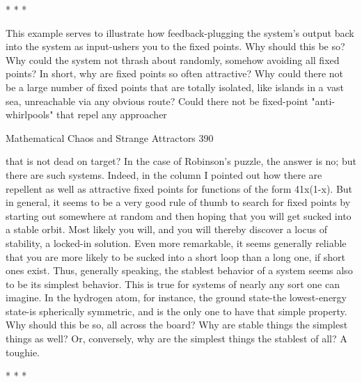                                          *   *   *

       This example serves to illustrate how feedback-plugging the system's output
back into the system as input-ushers you to the fixed points. Why should this be so?
Why could the system not thrash about randomly, somehow avoiding all fixed points?
In short, why are fixed points so often attractive? Why could there not be a large
number of fixed points that are totally isolated, like islands in a vast sea, unreachable
via any obvious route? Could there not be fixed-point "anti-whirlpools" that repel any
approacher




Mathematical Chaos and Strange Attractors                                                390

that is not dead on target? In the case of Robinson's puzzle, the answer is no; but there
are such systems. Indeed, in the column I pointed out how there are repellent as well
as attractive fixed points for functions of the form 41x(1-x). But in general, it seems
to be a very good rule of thumb to search for fixed points by starting out somewhere
at random and then hoping that you will get sucked into a stable orbit. Most likely you
will, and you will thereby discover a locus of stability, a locked-in solution.
         Even more remarkable, it seems generally reliable that you are more likely to
be sucked into a short loop than a long one, if short ones exist. Thus, generally
speaking, the stablest behavior of a system seems also to be its simplest behavior.
This is true for systems of nearly any sort one can imagine. In the hydrogen atom, for
instance, the ground state-the lowest-energy state-is spherically symmetric, and is the
only one to have that simple property. Why should this be so, all across the board?
Why are stable things the simplest things as well? Or, conversely, why are the
simplest things the stablest of all? A toughie.

                                        *   *   *

